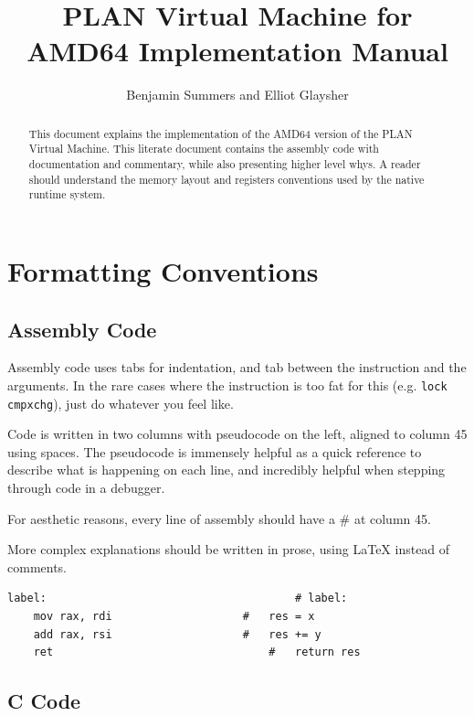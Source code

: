 

\title{PLAN Virtual Machine for AMD64 Implementation Manual}
\author{Benjamin Summers and Elliot Glaysher}


\maketitle
\tableofcontents
\begin{abstract}

  This document explains the implementation of the AMD64 version of the PLAN
  Virtual Machine. This literate document contains the assembly code with
  documentation and commentary, while also presenting higher level whys. A
  reader should understand the memory layout and registers conventions used by
  the native runtime system.

\end{abstract}
\section{Formatting Conventions}

\subsection{Assembly Code}

Assembly code uses tabs for indentation, and tab between the instruction
and the arguments.  In the rare cases where the instruction is too fat
for this (e.g. \lstinline|lock cmpxchg|), just do whatever you feel like.

Code is written in two columns with pseudocode on the left, aligned to
column 45 using spaces.  The pseudocode is immensely helpful as a quick
reference to describe what is happening on each line, and incredibly
helpful when stepping through code in a debugger.

For aesthetic reasons, every line of assembly should have a \# at
column 45.

More complex explanations should be written in prose, using LaTeX instead
of comments.

\begin{lstlisting}
label:                                      # label:
	mov	rax, rdi                    #   res = x
	add	rax, rsi                    #   res += y
	ret                                 #   return res
\end{lstlisting}

\subsection{C Code}


